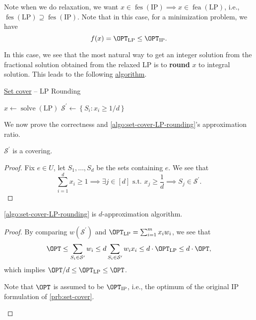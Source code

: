 \begin{note}
	Note when we do relaxation, we want \(x\in \mathop{\mathrm{fes}}(\text{IP}) \implies x\in \mathop{\mathrm{fea}}(\text{LP})\), i.e., \(\mathop{\mathrm{fes}}(\text{LP})\supseteq \mathop{\mathrm{fes}}(\text{IP})\). Note that in this case, for a minimization problem, we have
	\[
		f(x) = \OPT_\text{LP} \leq \OPT_\text{IP}.
	\]
\end{note}

In this case, we see that the most natural way to get an integer solution from the fractional solution obtained from the relaxed LP is to \textbf{round} \(x\) to integral solution. This leads to the following \hyperref[algo:set-cover-LP-rounding]{algorithm}.

\par
\begin{algorithm}[H]\label{algo:set-cover-LP-rounding}
	\DontPrintSemicolon
	\caption{\hyperref[prb:set-cover]{Set cover} -- LP Rounding}
	\BlankLine
	\(x\gets\mathop{\mathrm{solve}}(\text{LP})\)
	\(\mathcal{S} ^\prime \gets \left\{ S_i \colon x_{i} \geq 1 / d \right\}\)\;
	\;
\end{algorithm}

We now prove the correctness and \autoref{algo:set-cover-LP-rounding}'s approximation ratio.
\begin{lemma}
	\(\mathcal{S} ^\prime \) is a covering.
\end{lemma}
\begin{proof}
	Fix \(e\in U\), let \(S_1, \ldots  , S_d\) be the sets containing \(e\). We see that
	\[
		\sum_{i=1}^{d} x_{i} \geq 1\implies \exists j\in[d] \text{ s.t. } x_j \geq \frac{1}{d} \implies S_j\in \mathcal{S} ^\prime.
	\]
\end{proof}

\begin{theorem}\label{thm:lec2-1}
	\autoref{algo:set-cover-LP-rounding} is \(d\)-approximation algorithm.
\end{theorem}
\begin{proof}
	By comparing \(w(\mathcal{S} ^\prime )\) and \(\OPT_\text{LP} = \sum_{i=1}^{m} x_{i} w_{i}\), we see that
	\[
		\OPT \leq \sum_{S_i\in \mathcal{S} ^\prime }w_i \leq d \sum_{S_i\in \mathcal{S} ^\prime }w_{i} x_{i} \leq d\cdot \OPT_\text{LP} \leq d\cdot \OPT,
	\]
	which implies \(\OPT / d\leq \OPT_\text{LP} \leq \OPT\).

	\begin{note}
		Note that \(\OPT\) is assumed to be \(\OPT_{\text{IP}}\), i.e., the optimum of the original IP formulation of \autoref{prb:set-cover}.
	\end{note}
\end{proof}

